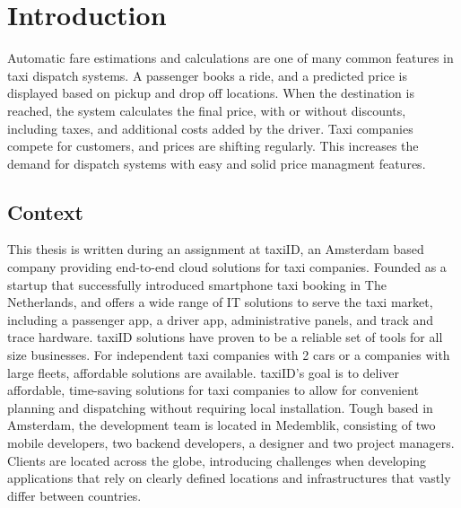 
\chapter{Introduction}

\ifpdf
    \graphicspath{{Chapter1/Figs/Raster/}{Chapter1/Figs/PDF/}{Chapter1/Figs/}}
\else
    \graphicspath{{Chapter1/Figs/Vector/}{Chapter1/Figs/}}
\fi

Automatic fare estimations and calculations are one of many common features in taxi dispatch systems. A passenger books a ride, and a predicted price is displayed based on pickup and drop off locations. When the destination is reached, the system calculates the final price, with or without discounts, including taxes, and additional costs added by the driver. Taxi companies compete for customers, and prices are shifting regularly. This increases the demand for dispatch systems with easy and solid price managment features.

%
\section{Context}
This thesis is written during an assignment at taxiID, an Amsterdam based company providing end-to-end cloud solutions for taxi companies. Founded as a startup that successfully introduced smartphone taxi booking in The Netherlands, and offers a wide range of IT solutions to serve the taxi market, including a passenger app, a driver app, administrative panels, and track and trace hardware. taxiID solutions have proven to be a reliable set of tools for all size businesses. For independent taxi companies with 2 cars or a companies with large fleets, affordable solutions are available. taxiID's goal is to deliver affordable, time-saving solutions for taxi companies to allow for convenient planning and dispatching without requiring local installation. Tough based in Amsterdam, the development team is located in Medemblik, consisting of two mobile developers, two backend developers, a designer and two project managers. Clients are located across the globe, introducing challenges when developing applications that rely on clearly defined locations and infrastructures that vastly differ between countries.

